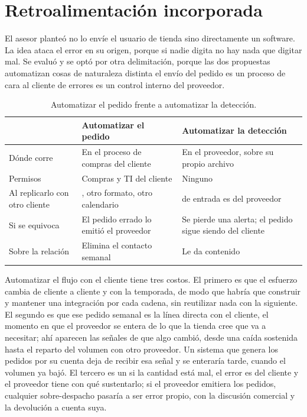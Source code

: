 \section{Retroalimentación incorporada}\label{sec:retro}

El asesor planteó  no lo envíe el usuario de tienda sino directamente un software. La idea ataca el error en su origen, porque si nadie digita no hay nada que digitar mal. Se evaluó y se optó por otra delimitación, porque las dos propuestas automatizan cosas de naturaleza distinta  el envío del pedido es un proceso de cara al cliente de errores es un control interno del proveedor.

\begin{table}[htbp]
\centering
\caption{Automatizar el pedido frente a automatizar la detección.}
\label{tab:retro}
\small
\begin{tabularx}{\textwidth}{@{}L{3cm}YY@{}}
\toprule
 & \textbf{Automatizar el pedido} & \textbf{Automatizar la detección} \\
\midrule
Dónde corre & En el proceso de compras del cliente & En el proveedor, sobre su propio archivo \\
Permisos & Compras y TI del cliente & Ninguno \\
Al replicarlo con otro cliente & , otro formato, otro calendario &  de entrada es del proveedor \\
Si se equivoca & El pedido errado lo emitió el proveedor & Se pierde una alerta; el pedido sigue siendo del cliente \\
Sobre la relación & Elimina el contacto semanal & Le da contenido \\
\bottomrule
\end{tabularx}
\end{table}

Automatizar el flujo con el cliente tiene tres costos. El primero es que el esfuerzo  cambia de cliente a cliente y con la temporada, de modo que habría que construir y mantener una integración por cada cadena, sin reutilizar nada con la siguiente. El segundo es que ese pedido semanal es la línea directa con el cliente, el momento en que el proveedor se entera de lo que la tienda cree que va a necesitar; ahí aparecen las señales de que algo cambió, desde una caída sostenida hasta el reparto del volumen con otro proveedor. Un sistema que genera los pedidos por su cuenta deja de recibir esa señal y se enteraría tarde, cuando el volumen ya bajó. El tercero es un  si la cantidad está mal, el error es del cliente y el proveedor tiene con qué sustentarlo; si el proveedor emitiera los pedidos, cualquier sobre-despacho pasaría a ser error propio, con la discusión comercial y la devolución a cuenta suya.

